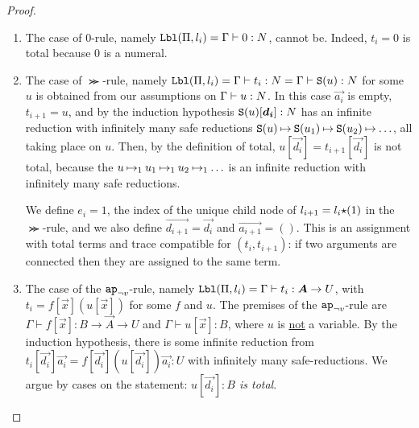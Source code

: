 \begin{proof}
\begin{enumerate}
\item
  The case of $0$-rule, namely ${\tt Lbl}(\Pi,l_i) = \Gamma\vdash 0:{N}$, 
  cannot be. Indeed, $t_i = 0$ is total because $0$ is a numeral.


\item 
  The case of $\Succ$-rule, 
namely ${\tt Lbl}(\Pi,l_i) = \Gamma\vdash t_i: {N} = \Gamma\vdash {\tt S}(u): {N}$
  for some $u$ is obtained from our assumptions on
  $\Gamma\vdash u: {N}$. In this case $\vec{a_i}$ is empty, $t_{i+1}=u$, and
  by the induction hypothesis $\Succ(u)[\vec{d_i}]:\N$ has an infinite reduction with
  infinitely many safe reductions
  ${\tt S}(u) \mathbin{\mapsto}  {\tt S}(u_1) \mathbin{\mapsto} {\tt S}(u_2) \mathbin{\mapsto} \ldots$,
  all taking place on $u$.
  Then, by the definition of total, $u[\vec{d_i}] =t_{i+1}[\vec{d_i}] $ is not total, because the
 $u \mathbin{\mapsto}_1  u_1 \mathbin{\mapsto}_1 u_2 \mathbin{\mapsto}_1 \ldots$ is an infinite reduction with
  infinitely many safe reductions.

  We define $e_{i}=1$, 
  the index of the unique child node of $l_{i+1}=l_i{\star}(1)$ in the $\Succ$-rule, and
  we also define $\vec{d_{i+1}} = \vec{d_i}$ and $\vec{a_{i+1}} = ()$. 
  This is an assignment with total terms and 
  trace compatible for $(t_i,t_{i+1})$: if two arguments are connected then they are assigned
  to the same term. 



\item
  The case of the $\apnotvar$-rule, namely 
  $\Label(\Pi,l_i) = \Gamma\vdash t_i: \vec{A}\rightarrow U$, 
  with $t_i = f[\vec{x}](u[\vec{x}])$ for some $f$ and $u$.
  The premises of the $\apnotvar$-rule
   are $\Gamma\vdash f[\vec{x}]: B \rightarrow \vec{A}\rightarrow U$ 
  and $\Gamma\vdash u[\vec{x}]: B$, where $u$ is \underline{not} a variable.
  By the induction hypothesis, there is some infinite reduction from
  $t_i[\vec{d_i}]\vec{a_i} = f[\vec{d_i}](u[\vec{d_i}])\vec{a_i}:U$ with infinitely many safe-reductions.
  We argue by cases on the statement: \emph{$u[\vec{d_i}]:B$ is total}.






\end{enumerate}
\end{proof}
